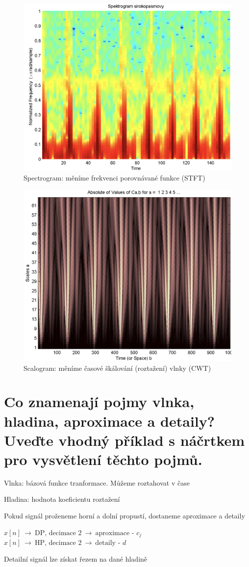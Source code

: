 \documentclass[a4paper,12pt]{article}   %
\begin{document}
\begin{figure}[h]
        \centering
        \includegraphics[width=.5\textwidth]{fig/spectrogram.png}
        \caption*{Spectrogram: měníme frekvenci porovnávané funkce (STFT)}
\end{figure}
\begin{figure}[h]
        \centering
        \includegraphics[width=.5\textwidth]{fig/scalogram.png}
        \caption*{Scalogram: měníme časové škálování (roztažení) vlnky (CWT)}
\end{figure}
\FloatBarrier

\section{Co znamenají pojmy vlnka, hladina, aproximace a detaily? Uveďte vhodný příklad s náčrtkem pro vysvětlení těchto pojmů.}
Vlnka: bázová funkce tranformace. Můžeme roztahovat v čase

Hladina: hodnota koeficientu roztažení

Pokud signál proženeme horní a dolní propustí, dostaneme aproximace a detaily

$x[n]~\rightarrow~\text{DP, decimace 2}~\rightarrow~\text{aproximace - }c_j$\\
$x[n]~\rightarrow~\text{HP, decimace 2}~\rightarrow~\text{detaily - }d$

Detailní signál lze získat řezem na dané hladině


\end{document}
